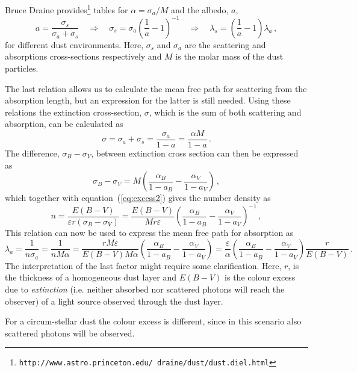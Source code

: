 \documentclass[a4paper,12pt]{article}
\begin{document}
Bruce Draine
provides\footnote{\texttt{http://www.astro.princeton.edu/~draine/dust/dust.diel.html}} tables for $\alpha =
\sigma_a/M$ and the albedo, $a$,
\begin{equation}
  a = \frac{\sigma_s}{\sigma_a + \sigma_s}
  \quad\Rightarrow\quad
  \sigma_s = \sigma_a\left(\frac{1}{a} - 1\right)^{-1}
  \quad\Rightarrow\quad
  \lambda_s = \left(\frac{1}{a} - 1\right)\lambda_a
  \,,
  \label{eq:sigmas}
\end{equation}
for different dust environments. Here, $\sigma_s$ and $\sigma_a$ are
the scattering and absorptions cross-sections respectively and $M$ is
the molar mass of the dust particles.

The last relation allows us to calculate the mean free path for
scattering from the absorption length, but an expression for the
latter is still needed. Using these relations the extinction
cross-section, $\sigma$, which is the sum of both scattering and
absorption, can be calculated as
\[
\sigma = \sigma_a + \sigma_s = \frac{\sigma_a}{1 - a} =
\frac{\alpha M}{1-a}\,.
\]
The difference, $\sigma_B-\sigma_V$, between extinction cross section
can then be expressed as
\[
\sigma_B-\sigma_V = M\left(\frac{\alpha_B}{1-a_B} -
  \frac{\alpha_V}{1-a_V}\right)\,,
\]
which together with equation~(\ref{eq:excess2}) gives the number
density as
\[
n = \frac{E(B-V)}{\varepsilon r\left(\sigma_B-\sigma_V\right)} =
\frac{E(B-V)}{Mr\varepsilon}
\left(\frac{\alpha_B}{1-a_B} -
  \frac{\alpha_V}{1-a_V}\right)^{-1} \, ,
\]
This relation can now be used to express the mean free path for
absorption as
\[
\lambda_a = \frac{1}{n\sigma_a} = \frac{1}{nM\alpha} =
\frac{rM\varepsilon}{E(B-V)M\alpha} \left(\frac{\alpha_B}{1-a_B} -
  \frac{\alpha_V}{1-a_V}\right) =
\frac{\varepsilon}{\alpha}\left(\frac{\alpha_B}{1-a_B} -
    \frac{\alpha_V}{1-a_V}\right)\frac{r}{E(B-V)}\, .
\]
The interpretation of the last factor might require some
clarification. Here, $r$, is the thickness of a homogeneous dust layer
and $E(B-V)$ is the colour excess due to \emph{extinction} (i.e.
neither absorbed nor scattered photons will reach the observer) of a
light source observed through the dust layer.

For a circum-stellar dust the colour excess is different, since in
this scenario also scattered photons will be observed.
\end{document}
